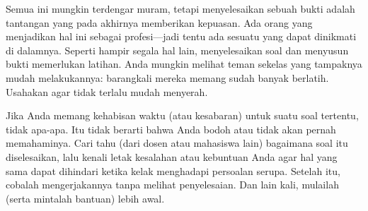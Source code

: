 \documentclass[../../../include/open-logic-section]{subfiles}
\begin{document}
Semua ini mungkin terdengar muram, tetapi menyelesaikan sebuah bukti adalah
tantangan yang pada akhirnya memberikan kepuasan. Ada orang yang menjadikan
hal ini sebagai profesi---jadi tentu ada sesuatu yang dapat dinikmati di
dalamnya. Seperti hampir segala hal lain, menyelesaikan soal dan menyusun
bukti memerlukan latihan. Anda mungkin melihat teman sekelas yang tampaknya
mudah melakukannya: barangkali mereka memang sudah banyak berlatih. Usahakan
agar tidak terlalu mudah menyerah.

Jika Anda memang kehabisan waktu (atau kesabaran) untuk suatu soal tertentu,
tidak apa-apa. Itu tidak berarti bahwa Anda bodoh atau tidak akan pernah
memahaminya. Cari tahu (dari dosen atau mahasiswa lain) bagaimana soal itu
diselesaikan, lalu kenali letak kesalahan atau kebuntuan Anda agar hal yang
sama dapat dihindari ketika kelak menghadapi persoalan serupa. Setelah itu,
cobalah mengerjakannya tanpa melihat penyelesaian. Dan lain kali, mulailah
(serta mintalah bantuan) lebih awal.
\end{document}
